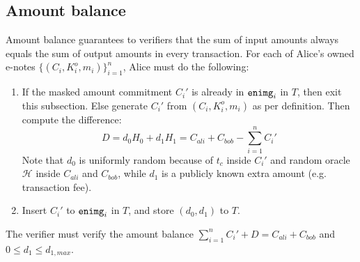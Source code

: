 \documentclass{article}
\theoremstyle{plain}
\theoremstyle{remark}
\begin{document}
\subsection{Amount balance}\label{amt-bal}
Amount balance guarantees to verifiers that the sum of input amounts always equals the sum of output amounts in
every transaction. For each of Alice's owned e-notes $\{(C_i,K_i^o,m_i)\}_{i=1}^n$, Alice must do the following:
\begin{enumerate}
    \item If the masked amount commitment $C_i'$ is already in ${\tt enimg}_i$ in $T$, then exit this subsection. Else generate $C_i'$ from $(C_i, K_i^o, m_i)$ as per definition. Then compute the difference:
    $$D = d_0 H_0 + d_1 H_1 = C_{ali}+C_{bob} - \sum_{i=1}^n{C_i'}$$
    Note that $d_0$ is uniformly random because of $t_c$ inside $C_i'$ and random oracle $\mathcal{H}$ inside $C_{ali}$ and $C_{bob}$, while $d_1$ is a publicly known extra amount (e.g. transaction fee).
    \item Insert $C_i'$ to ${\tt enimg}_i$ in $T$, and store $(d_0, d_1)$ to $T$.
\end{enumerate}
The verifier must verify the amount balance $\sum_{i=1}^n{C_i'} + D = C_{ali}+C_{bob}$ and $0\le d_1 \le d_{1,max}$.
\end{document}
